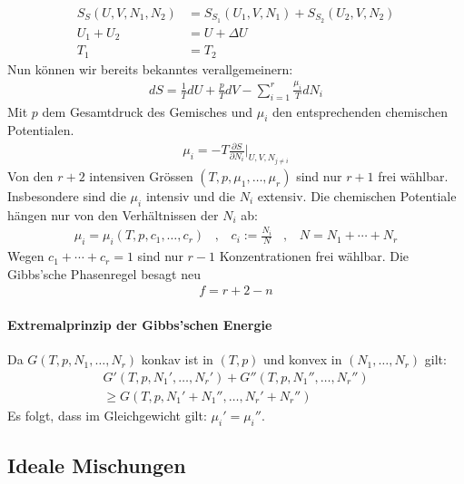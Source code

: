 \begin{align*}
    S_S (U,V,N_1,N_2) &= S_{S_1} (U_1,V,N_1) + S_{S_2} (U_2,V,N_2)
    \\
    U_1 + U_2 &= U + \Delta U
    \\
    T_1 &= T_2
\end{align*}
Nun können wir bereits bekanntes verallgemeinern:
\begin{align*}
    dS = \frac{1}{T} d U + \frac{p}{T} dV - \sum_{i=1}^r \frac{\mu_i}{T} d N_i
\end{align*}
Mit $p$ dem Gesamtdruck des Gemisches und $\mu_i$ den entsprechenden
chemischen Potentialen.
\begin{align*}
    \mu_i = - T \frac{\partial S}{\partial N_i} \Big|_{U,V,N_{j \neq i}}
\end{align*}
Von den $r+2$ intensiven Grössen $(T,p,\mu_1,\dots,\mu_r)$ sind nur $r+1$
frei wählbar. Insbesondere sind die $\mu_i$ intensiv und die $N_i$ extensiv.
Die chemischen Potentiale hängen nur von den Verhältnissen der $N_i$ ab:
\begin{align*}
    \mu_i = \mu_i(T,p,c_1,\dots,c_r)
    \hspace{10pt} , \hspace{10pt}
    c_i := \frac{N_i}{N}
    \hspace{10pt} , \hspace{10pt}
    N = N_1 + \dotsb + N_r
\end{align*}
Wegen $c_1 + \dotsb + c_r = 1$ sind nur $r-1$ Konzentrationen frei wählbar.
Die Gibbs'sche Phasenregel besagt neu
\begin{align*}
    f = r+2-n
\end{align*}

\paragraph{Extremalprinzip der Gibbs'schen Energie}
Da $G(T,p,N_1,\dots,N_r)$ konkav ist in $(T,p)$ und konvex in $(N_1,\dots,N_r)$
gilt:
\begin{align*}
    G'(T,p,N_1',\dots,N_r') + G'' (T,p,N_1'',\dots,N_r'') 
    \\ \geq
    G(T,p,N_1' + N_1'' ,\dots, N_r' + N_r'')
\end{align*}
Es folgt, dass im Gleichgewicht gilt: $\mu_i' = \mu_i''$.

\subsection{Ideale Mischungen}

